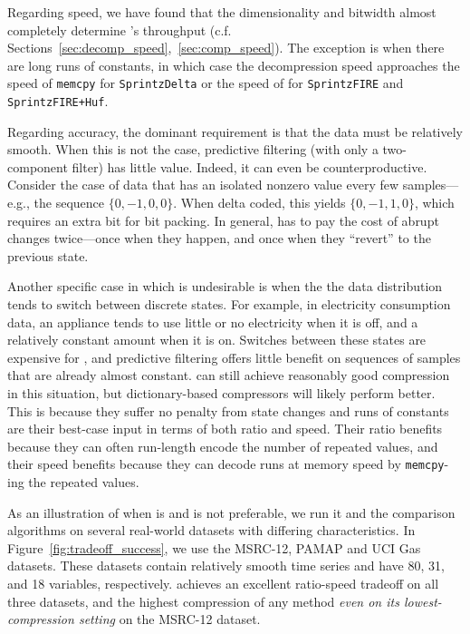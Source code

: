 Regarding speed, we have found that the dimensionality and bitwidth almost completely determine \mine's throughput (c.f. Sections~\ref{sec:decomp_speed},~\ref{sec:comp_speed}). The exception is when there are long runs of constants, in which case the decompression speed approaches the speed of \texttt{memcpy} for \texttt{SprintzDelta} or the speed of \fire for \texttt{SprintzFIRE} and \texttt{SprintzFIRE+Huf}.

Regarding accuracy, the dominant requirement is that the data must be relatively smooth. When this is not the case, predictive filtering (with only a two-component filter) has little value. Indeed, it can even be counterproductive. Consider the case of data that has an isolated nonzero value every few samples---e.g., the sequence $\{0, -1, 0, 0\}$. When delta coded, this yields $\{0, -1, 1, 0\}$, which requires an extra bit for \minesp bit packing. In general, \minesp has to pay the cost of abrupt changes twice---once when they happen, and once when they ``revert'' to the previous state.

Another specific case in which \mine is undesirable is when the the data distribution tends to switch between discrete states. For example, in electricity consumption data, an appliance tends to use little or no electricity when it is off, and a relatively constant amount when it is on. Switches between these states are expensive for \minesp, and predictive filtering offers little benefit on sequences of samples that are already almost constant. \minesp can still achieve reasonably good compression in this situation, but dictionary-based compressors will likely perform better. This is because they suffer no penalty from state changes and runs of constants are their best-case input in terms of both ratio and speed. Their ratio benefits because they can often run-length encode the number of repeated values, and their speed benefits because they can decode runs at memory speed by \texttt{memcpy}-ing the repeated values.

As an illustration of when \minesp is and is not preferable, we run it and the comparison algorithms on several real-world datasets with differing characteristics. In Figure~\ref{fig:tradeoff_success}, we use the MSRC-12, PAMAP and UCI Gas datasets. These datasets contain relatively smooth time series and have 80, 31, and 18 variables, respectively. \minesp achieves an excellent ratio-speed tradeoff on all three datasets, and the highest compression of any method \textit{even on its lowest-compression setting} on the MSRC-12 dataset.


